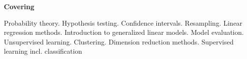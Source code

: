 \documentclass[12pt]{article}\usepackage[]{graphicx}\usepackage[]{color}
\begin{document}
\vspace{0.5cm}
\Large
\LARGE \textbf{Covering} 




\Large Probability theory. \LARGE Hypothesis testing. \Large Confidence intervals. \LARGE Resampling. \Large Linear regression methods. \LARGE Introduction to generalized linear models. \Large Model evaluation. \LARGE Unsupervised learning. \Large Clustering. \LARGE Dimension reduction methods. \large Supervised learning incl. classification



\large
\vspace{0.2cm}
\end{document}
